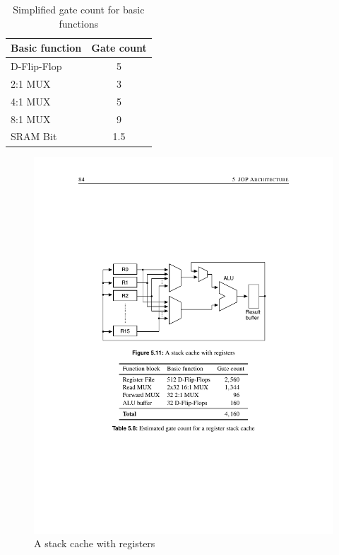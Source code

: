 \begin{table}[hbtp]
    \centering
    \begin{tabular}{lc}
        \toprule
        Basic function & Gate count \\
        \midrule
        D-Flip-Flop&5 \\
        2:1 MUX&3 \\
        4:1 MUX&5 \\
        8:1 MUX&9 \\
        SRAM Bit&1.5 \\
        \bottomrule
    \end{tabular}
    \caption{Simplified gate count for basic functions}
    \label{tab_simp_gate_count}
\end{table}

\begin{figure}
    \centering
    \includegraphics[scale=\picscale]{stack/stack_cache_reg}
    \caption{A stack cache with registers}
    \label{fig_stack_cache_reg}

    \vspace{\floatsep}    %


\end{figure}
